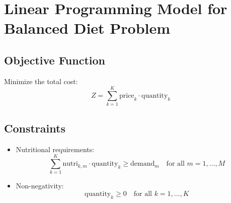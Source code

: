 \documentclass{article}
\begin{document}
\section*{Linear Programming Model for Balanced Diet Problem}

\subsection*{Objective Function}
Minimize the total cost:
\[
Z = \sum_{k=1}^{K} \text{price}_k \cdot \text{quantity}_k
\]

\subsection*{Constraints}
\begin{itemize}
    \item Nutritional requirements:
    \[
    \sum_{k=1}^{K} \text{nutri}_{k,m} \cdot \text{quantity}_k \geq \text{demand}_m \quad \text{for all } m = 1, \ldots, M
    \]

    \item Non-negativity:
    \[
    \text{quantity}_k \geq 0 \quad \text{for all } k = 1, \ldots, K
    \]
\end{itemize}
\end{document}
